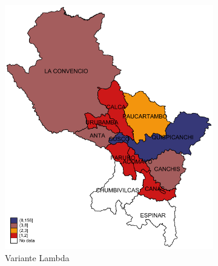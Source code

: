 \documentclass[12pt,a4paper,openany]{book}
\begin{document}
			\begin{figure}[h]
				\caption{Distribución provincial de las variantes de SARS-Cov-2 aisladas en la Región Cusco hasta la SE 03-2022.}
				\label{fig:mapa_variantes}
				\centering
				\begin{subfigure}[b]{0.40\textwidth}
					\centering
					\includegraphics[width=\textwidth]{../figuras/variantes_provincial_lambda.pdf}
					\caption{Variante Lambda}
				\end{subfigure}
				\hfill
				\begin{subfigure}[b]{0.40\textwidth}
					\centering

\end{subfigure}
\end{figure}
\end{document}
